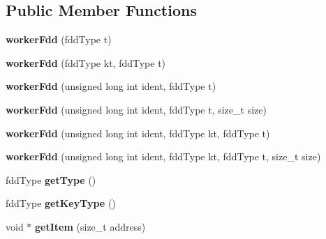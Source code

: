 \subsection*{Public Member Functions}
\begin{DoxyCompactItemize}
\item 
\hypertarget{classfaster_1_1workerFdd_a93ad6099e1b600358729aa45952c6ac9}{}{\bfseries worker\+Fdd} (fdd\+Type t)\label{classfaster_1_1workerFdd_a93ad6099e1b600358729aa45952c6ac9}

\item 
\hypertarget{classfaster_1_1workerFdd_aa07a10094bc1f054d2bb5fe89f3c2379}{}{\bfseries worker\+Fdd} (fdd\+Type kt, fdd\+Type t)\label{classfaster_1_1workerFdd_aa07a10094bc1f054d2bb5fe89f3c2379}

\item 
\hypertarget{classfaster_1_1workerFdd_a4d9f824ec396f44f4876f39f665c719b}{}{\bfseries worker\+Fdd} (unsigned long int ident, fdd\+Type t)\label{classfaster_1_1workerFdd_a4d9f824ec396f44f4876f39f665c719b}

\item 
\hypertarget{classfaster_1_1workerFdd_a592fd4bca2d66794987a8084c80e3248}{}{\bfseries worker\+Fdd} (unsigned long int ident, fdd\+Type t, size\+\_\+t size)\label{classfaster_1_1workerFdd_a592fd4bca2d66794987a8084c80e3248}

\item 
\hypertarget{classfaster_1_1workerFdd_af9f296569b13b1c548658eb083c86104}{}{\bfseries worker\+Fdd} (unsigned long int ident, fdd\+Type kt, fdd\+Type t)\label{classfaster_1_1workerFdd_af9f296569b13b1c548658eb083c86104}

\item 
\hypertarget{classfaster_1_1workerFdd_afc006b52499d50841f0a0aedd19331b3}{}{\bfseries worker\+Fdd} (unsigned long int ident, fdd\+Type kt, fdd\+Type t, size\+\_\+t size)\label{classfaster_1_1workerFdd_afc006b52499d50841f0a0aedd19331b3}

\item 
\hypertarget{classfaster_1_1workerFdd_ab514e2448a2cce4fba81ad9c0a416bc2}{}fdd\+Type {\bfseries get\+Type} ()\label{classfaster_1_1workerFdd_ab514e2448a2cce4fba81ad9c0a416bc2}

\item 
\hypertarget{classfaster_1_1workerFdd_aade07f21fc06c775ac8478c365965fc6}{}fdd\+Type {\bfseries get\+Key\+Type} ()\label{classfaster_1_1workerFdd_aade07f21fc06c775ac8478c365965fc6}

\item 
\hypertarget{classfaster_1_1workerFdd_a1a2df11935f3fe1907aaaa6dd7b012b9}{}void $\ast$ {\bfseries get\+Item} (size\+\_\+t address)\label{classfaster_1_1workerFdd_a1a2df11935f3fe1907aaaa6dd7b012b9}


\end{DoxyCompactItemize}
